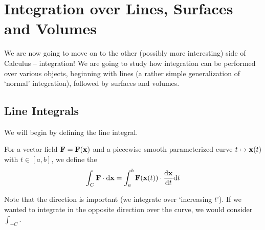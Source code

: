 \documentclass[a4paper]{scrreprt}
\begin{document}
\chapter{Integration over Lines, Surfaces and Volumes}

We are now going to move on to the other (possibly more interesting) side of Calculus -- integration! We are going to study how integration can be performed over various objects, beginning with lines (a rather simple generalization of `normal' integration), followed by surfaces and volumes.

\section{Line Integrals}

We will begin by defining the line integral.

\begin{definition}
	For a vector field $\mathbf{F} = \mathbf{F}(\mathbf{x})$ and a piecewise smooth parameterized curve $t \mapsto \mathbf{x}(t)$ with $t \in [a, b]$, we define the 
	$$
	\int_C \mathbf{F} \cdot \mathrm{d} \mathbf{x} = \int_a^b \mathbf{F}(\mathbf{x}(t)) \cdot \frac{\mathrm{d} \mathbf{x}}{\mathrm{d} t} \mathrm{d} t
 	$$
\end{definition}

Note that the direction is important (we integrate over `increasing $t$'). If we wanted to integrate in the opposite direction over the curve, we would consider $\int_{-C}$.
\end{document}
